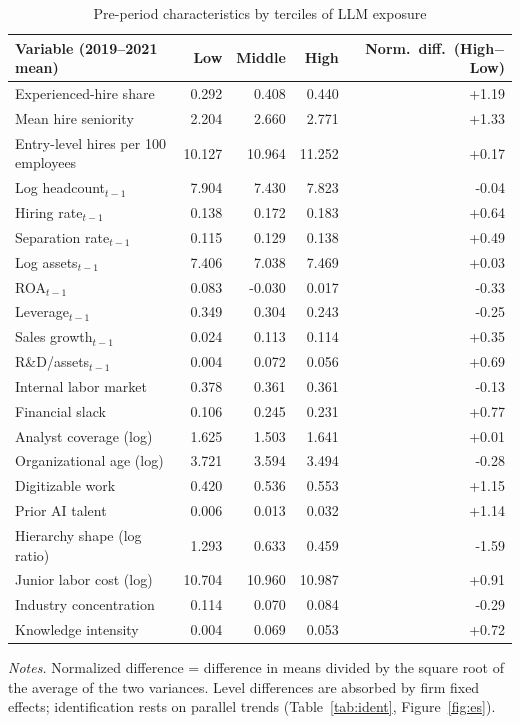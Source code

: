 \begin{table}[!htbp]\centering\footnotesize
\caption{Pre-period characteristics by terciles of LLM exposure}\label{tab:balance}
\begin{tabular}{lrrrr}
\toprule
Variable (2019--2021 mean) & Low & Middle & High & Norm.\ diff.\ (High$-$Low) \\
\midrule
Experienced-hire share & 0.292 & 0.408 & 0.440 & +1.19 \\
Mean hire seniority & 2.204 & 2.660 & 2.771 & +1.33 \\
Entry-level hires per 100 employees & 10.127 & 10.964 & 11.252 & +0.17 \\
Log headcount$_{t-1}$ & 7.904 & 7.430 & 7.823 & -0.04 \\
Hiring rate$_{t-1}$ & 0.138 & 0.172 & 0.183 & +0.64 \\
Separation rate$_{t-1}$ & 0.115 & 0.129 & 0.138 & +0.49 \\
Log assets$_{t-1}$ & 7.406 & 7.038 & 7.469 & +0.03 \\
ROA$_{t-1}$ & 0.083 & -0.030 & 0.017 & -0.33 \\
Leverage$_{t-1}$ & 0.349 & 0.304 & 0.243 & -0.25 \\
Sales growth$_{t-1}$ & 0.024 & 0.113 & 0.114 & +0.35 \\
R\&D/assets$_{t-1}$ & 0.004 & 0.072 & 0.056 & +0.69 \\
Internal labor market & 0.378 & 0.361 & 0.361 & -0.13 \\
Financial slack & 0.106 & 0.245 & 0.231 & +0.77 \\
Analyst coverage (log) & 1.625 & 1.503 & 1.641 & +0.01 \\
Organizational age (log) & 3.721 & 3.594 & 3.494 & -0.28 \\
Digitizable work & 0.420 & 0.536 & 0.553 & +1.15 \\
Prior AI talent & 0.006 & 0.013 & 0.032 & +1.14 \\
Hierarchy shape (log ratio) & 1.293 & 0.633 & 0.459 & -1.59 \\
Junior labor cost (log) & 10.704 & 10.960 & 10.987 & +0.91 \\
Industry concentration & 0.114 & 0.070 & 0.084 & -0.29 \\
Knowledge intensity & 0.004 & 0.069 & 0.053 & +0.72 \\
\bottomrule
\end{tabular}
\begin{minipage}{0.95\linewidth}\vspace{2pt}\scriptsize\textit{Notes.} Normalized difference = difference in means divided by the square root of the average of the two variances. Level differences are absorbed by firm fixed effects; identification rests on parallel trends (Table~\ref{tab:ident}, Figure~\ref{fig:es}).\end{minipage}
\end{table}